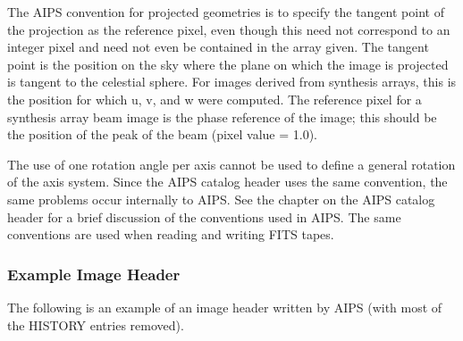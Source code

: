 The AIPS convention for projected geometries is to specify the tangent
point of the projection as the reference pixel, even though this need
not correspond to an integer pixel and need not even be contained in
the array given.  The tangent point is the position on the sky where
the plane on which the image is projected is tangent to the celestial
sphere.  For images derived from synthesis arrays, this is the
position for which u, v, and w were computed.  The reference pixel for
a synthesis array beam image is the phase reference of the image; this
should be the position of the peak of the beam (pixel value = 1.0).

The use of one rotation angle per axis cannot be used to define a
general rotation of the axis system.  Since the AIPS catalog header
uses the same convention, the same problems occur internally to AIPS.
See the chapter on the AIPS catalog header for a brief discussion of
the conventions used in AIPS.  The same conventions are used when
reading and writing FITS tapes.

\subsubsection{Example Image Header }
The following is an example of an image header written by AIPS (with
most of the HISTORY entries removed).

